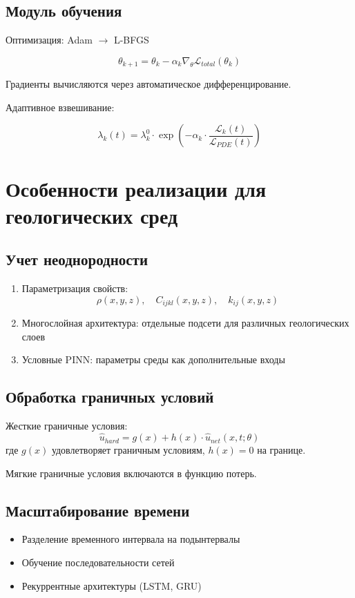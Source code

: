 \subsection{Модуль обучения}

Оптимизация: Adam $\to$ L-BFGS

\begin{equation}
\theta_{k+1} = \theta_k - \alpha_k \nabla_\theta \mathcal{L}_{total}(\theta_k)
\end{equation}

Градиенты вычисляются через автоматическое дифференцирование.  

Адаптивное взвешивание:

\begin{equation}
\lambda_k(t) = \lambda_k^0 \cdot \exp\left(-\alpha_k \cdot \frac{\mathcal{L}_k(t)}{\mathcal{L}_{PDE}(t)}\right)
\end{equation}

\section{Особенности реализации для геологических сред}

\subsection{Учет неоднородности}

\begin{enumerate}
    \item Параметризация свойств:
    \begin{equation}
    \rho(x, y, z), \quad C_{ijkl}(x, y, z), \quad k_{ij}(x, y, z)
    \end{equation}
    \item Многослойная архитектура: отдельные подсети для различных геологических слоев
    \item Условные PINN: параметры среды как дополнительные входы
\end{enumerate}

\subsection{Обработка граничных условий}

Жесткие граничные условия:
\begin{equation}
\hat{u}_{hard} = g(x) + h(x) \cdot \hat{u}_{net}(x, t; \theta)
\end{equation}
где $g(x)$ удовлетворяет граничным условиям, $h(x) = 0$ на границе.  

Мягкие граничные условия включаются в функцию потерь.

\subsection{Масштабирование времени}

\begin{itemize}
    \item Разделение временного интервала на подынтервалы
    \item Обучение последовательности сетей
    \item Рекуррентные архитектуры (LSTM, GRU)
\end{itemize}


